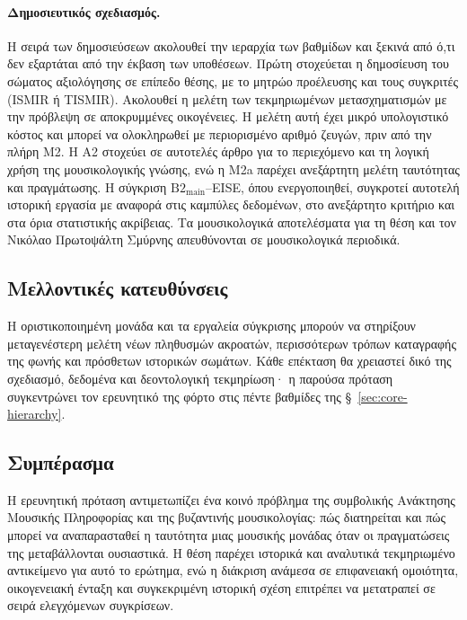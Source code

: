 \documentclass[11pt,a4paper]{article}
\begin{document}
\paragraph{Δημοσιευτικός σχεδιασμός.} Η σειρά των δημοσιεύσεων ακολουθεί την ιεραρχία των βαθμίδων και ξεκινά από ό,τι δεν εξαρτάται από την έκβαση των υποθέσεων. Πρώτη στοχεύεται η δημοσίευση του σώματος αξιολόγησης σε επίπεδο θέσης, με το μητρώο προέλευσης και τους συγκριτές (ISMIR ή TISMIR). Ακολουθεί η μελέτη των τεκμηριωμένων μετασχηματισμών με την πρόβλεψη σε αποκρυμμένες οικογένειες. Η μελέτη αυτή έχει μικρό υπολογιστικό κόστος και μπορεί να ολοκληρωθεί με περιορισμένο αριθμό ζευγών, πριν από την πλήρη M2. Η Α2 στοχεύει σε αυτοτελές άρθρο για το περιεχόμενο και τη λογική χρήση της μουσικολογικής γνώσης, ενώ η Μ2a παρέχει ανεξάρτητη μελέτη ταυτότητας και πραγμάτωσης. Η σύγκριση $\mathrm{B2}_{\mathrm{main}}$--EISE, όπου ενεργοποιηθεί, συγκροτεί αυτοτελή ιστορική εργασία με αναφορά στις καμπύλες δεδομένων, στο ανεξάρτητο κριτήριο και στα όρια στατιστικής ακρίβειας. Τα μουσικολογικά αποτελέσματα για τη θέση και τον Νικόλαο Πρωτοψάλτη Σμύρνης απευθύνονται σε μουσικολογικά περιοδικά.


\subsection{Μελλοντικές κατευθύνσεις}

Η οριστικοποιημένη μονάδα και τα εργαλεία σύγκρισης μπορούν να στηρίξουν μεταγενέστερη μελέτη νέων πληθυσμών ακροατών, περισσότερων τρόπων καταγραφής της φωνής και πρόσθετων ιστορικών σωμάτων. Κάθε επέκταση θα χρειαστεί δικό της σχεδιασμό, δεδομένα και δεοντολογική τεκμηρίωση· η παρούσα πρόταση συγκεντρώνει τον ερευνητικό της φόρτο στις πέντε βαθμίδες της §~\ref{sec:core-hierarchy}.

\subsection{Συμπέρασμα}

Η ερευνητική πρόταση αντιμετωπίζει ένα κοινό πρόβλημα της συμβολικής Ανάκτησης Μουσικής Πληροφορίας και της βυζαντινής μουσικολογίας: πώς διατηρείται και πώς μπορεί να αναπαρασταθεί η ταυτότητα μιας μουσικής μονάδας όταν οι πραγματώσεις της μεταβάλλονται ουσιαστικά. Η θέση παρέχει ιστορικά και αναλυτικά τεκμηριωμένο αντικείμενο για αυτό το ερώτημα, ενώ η διάκριση ανάμεσα σε επιφανειακή ομοιότητα, οικογενειακή ένταξη και συγκεκριμένη ιστορική σχέση επιτρέπει να μετατραπεί σε σειρά ελεγχόμενων συγκρίσεων.
\end{document}
